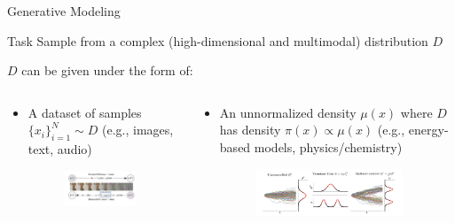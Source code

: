 \documentclass[aspectratio=169,xcolor=dvipsnames]{beamer}
\begin{document}
\begin{frame}[t]{Generative Modeling}
\scriptsize
\begin{block}{Task}
    Sample from a complex (high-dimensional and multimodal) distribution $D$
\end{block}

$D$ can be given under the form of:

\begin{columns}[t]
\begin{column}{0.48\textwidth}
\begin{itemize}\itemsep2pt
    \item A dataset of samples $\{x_i\}_{i=1}^N \sim D$ (e.g., images, text, audio)
    \begin{figure}
        \centering
        \includegraphics[width=0.9\textwidth]{figures/score_diffusion.png}
    \end{figure}
\end{itemize}
\end{column}
\begin{column}{0.48\textwidth}
\begin{itemize}\itemsep2pt
    \item An unnormalized density $\mu(x)$ where $D$ has density $\pi(x) \propto \mu(x)$ (e.g., 
    energy-based models, physics/chemistry)
    \begin{figure}
        \centering
        \includegraphics[width=0.9\textwidth]{figures/unconctrolled.png}
    \end{figure}
\end{itemize}
\end{column}
\end{columns}

\end{frame}
\end{document}
